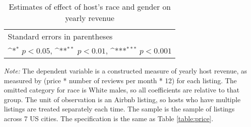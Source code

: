 \begin{table}[htbp]\centering
	\def\sym#1{\ifmmode^{#1}\else\(^{#1}\)\fi}
	\caption{Estimates of effect of host's race and gender on yearly revenue}
	\begin{tabular}{l*{4}{c}}
		\hline\hline
		
		\hline\hline
		\multicolumn{5}{l}{\footnotesize Standard errors in parentheses}\\
		\multicolumn{5}{l}{\footnotesize \sym{*} \(p<0.05\), \sym{**} \(p<0.01\), \sym{***} \(p<0.001\)}\\
	\end{tabular}
\label{revenue}
	\begin{tablenotes}
		\item {\it Note:} The dependent variable is a constructed measure of yearly host revenue, as measured by (price * number of reviews per month * 12) for each listing. The omitted category for race is White males, so all coefficients are relative to that group. The unit of observation is an Airbnb listing, so hosts who have multiple listings are treated separately each time. The sample is the sample of listings across 7 US cities. The specification is the same as Table \ref{table:price}.
	\end{tablenotes}
\end{table}
